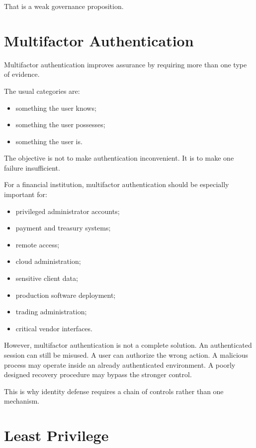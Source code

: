 That is a weak governance proposition.

\section{Multifactor Authentication}

Multifactor authentication improves assurance by requiring more than one type of evidence.

The usual categories are:

\begin{itemize}
    \item something the user knows;
    \item something the user possesses;
    \item something the user is.
\end{itemize}

The objective is not to make authentication inconvenient. It is to make one failure insufficient.

For a financial institution, multifactor authentication should be especially important for:

\begin{itemize}
    \item privileged administrator accounts;
    \item payment and treasury systems;
    \item remote access;
    \item cloud administration;
    \item sensitive client data;
    \item production software deployment;
    \item trading administration;
    \item critical vendor interfaces.
\end{itemize}

However, multifactor authentication is not a complete solution. An authenticated session can still be misused. A user can authorize the wrong action. A malicious process may operate inside an already authenticated environment. A poorly designed recovery procedure may bypass the stronger control.

This is why identity defense requires a chain of controls rather than one mechanism.

\section{Least Privilege}

